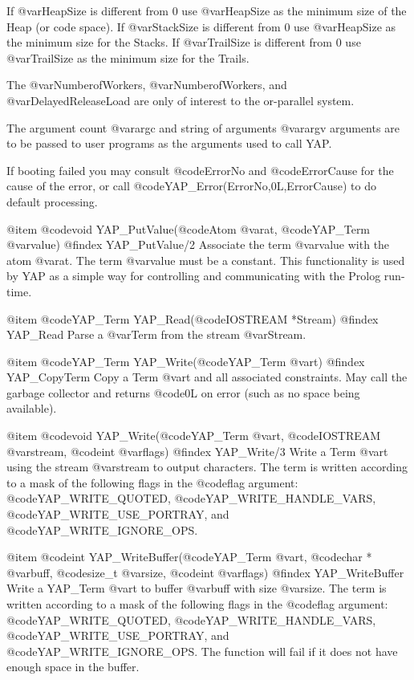 If @var{HeapSize} is different from 0 use @var{HeapSize} as the minimum
size of the Heap (or code space). If @var{StackSize} is different from 0
use @var{HeapSize} as the minimum size for the Stacks. If
@var{TrailSize} is different from 0 use @var{TrailSize} as the minimum
size for the Trails.

The @var{NumberofWorkers}, @var{NumberofWorkers}, and
@var{DelayedReleaseLoad} are only of interest to the or-parallel system.

The argument count @var{argc} and string of arguments @var{argv}
arguments are to be passed to user programs as the arguments used to
call YAP.

If booting failed you may consult @code{ErrorNo} and @code{ErrorCause}
for the cause of the error, or call
@code{YAP_Error(ErrorNo,0L,ErrorCause)} to do default processing. 


@item  @code{void} YAP_PutValue(@code{Atom} @var{at}, @code{YAP_Term} @var{value})
@findex  YAP_PutValue/2
Associate the term @var{value} with the atom @var{at}. The term
@var{value} must be a constant. This functionality is used by YAP as a
simple way for controlling and communicating with the Prolog run-time.

@item  @code{YAP_Term} YAP_Read(@code{IOSTREAM *Stream})
@findex  YAP_Read
Parse a @var{Term} from the stream @var{Stream}.

@item  @code{YAP_Term} YAP_Write(@code{YAP_Term} @var{t})
@findex  YAP_CopyTerm
Copy a Term @var{t} and all associated constraints. May call the garbage
collector and returns @code{0L} on error (such as no space being
available).

@item  @code{void} YAP_Write(@code{YAP_Term} @var{t}, @code{IOSTREAM} @var{stream}, @code{int} @var{flags})
@findex  YAP_Write/3
Write a Term @var{t} using the stream @var{stream} to output
characters. The term is written according to a mask of the following
flags in the @code{flag} argument: @code{YAP_WRITE_QUOTED},
@code{YAP_WRITE_HANDLE_VARS}, @code{YAP_WRITE_USE_PORTRAY},  and @code{YAP_WRITE_IGNORE_OPS}.

@item  @code{int} YAP_WriteBuffer(@code{YAP_Term} @var{t}, @code{char *} @var{buff}, @code{size_t} @var{size}, @code{int} @var{flags})
@findex  YAP_WriteBuffer
Write a YAP_Term @var{t} to buffer @var{buff} with size
@var{size}. The term is written
according to a mask of the following flags in the @code{flag}
argument: @code{YAP_WRITE_QUOTED}, @code{YAP_WRITE_HANDLE_VARS},
@code{YAP_WRITE_USE_PORTRAY}, and @code{YAP_WRITE_IGNORE_OPS}. The
function will fail if it does not have enough space in the buffer.


